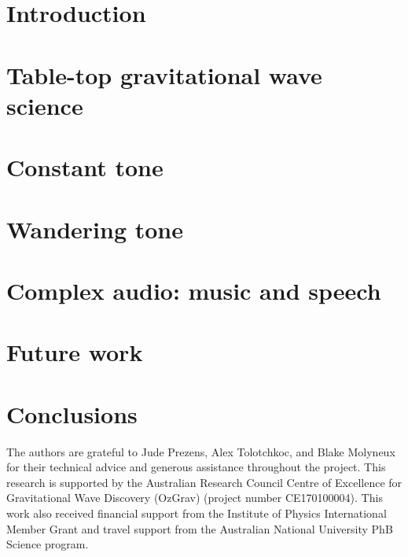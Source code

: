 \documentclass[pra,superscriptaddress,reprint,amsmath,amssymb,nofootinbib]{revtex4-1}
\begin{document}
\maketitle

\section{Introduction}
\label{sec:introduction}



\section{Table-top gravitational wave science}
\label{sec:ifo}



\section{Constant tone}
\label{sec:single_tone}


 
\section{Wandering tone}
\label{sec:viterbi_wandering}



\section{Complex audio: music and speech}
\label{sec:optical_microphone}



\section{Future work}
\label{sec:future_work}



\section{Conclusions}
\label{sec:conclusions}






\begin{acknowledgments}
The authors are grateful to Jude Prezens, Alex Tolotchkoc, and Blake Molyneux for their technical advice and generous assistance throughout the project. 
This research is supported by the Australian Research Council Centre of Excellence for Gravitational Wave Discovery (OzGrav) (project number CE170100004). 
This work also received financial support from the Institute of Physics International Member Grant and travel support from the Australian National University PhB Science program.

\end{acknowledgments}


\appendix



\nocite{*}


\end{document}
